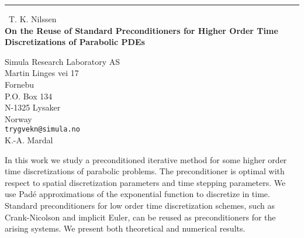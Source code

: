 \documentclass{report}
\begin{document}
\begin{center}
\rule{6in}{1pt} \
{\large T. K. Nilssen \\
{\bf On the Reuse of Standard Preconditioners for Higher Order Time Discretizations of Parabolic PDEs}}

Simula Research Laboratory AS \\ Martin Linges vei 17 \\ Fornebu \\ P.O. Box 134 \\ N-1325 Lysaker \\ Norway
\\
{\tt trygvekn@simula.no}\\
K.-A. Mardal\end{center}

In this work we study a preconditioned iterative method for some higher
order time discretizations of parabolic problems.
The preconditioner is optimal with respect to spatial
discretization parameters and time stepping parameters.
We use Pad\'{e} approximations of the exponential function to
discretize in time. Standard preconditioners for low order
time discretization schemes, such as Crank-Nicolson and implicit Euler,
can be reused as preconditioners for the arising systems. We present both
theoretical and numerical results.
\end{document}
